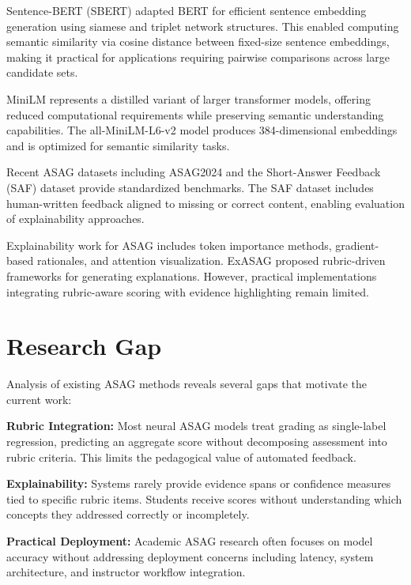 \documentclass[conference]{IEEEtran}
\begin{document}
Sentence-BERT (SBERT) \cite{sbert} adapted BERT for efficient sentence embedding generation using siamese and triplet network structures. This enabled computing semantic similarity via cosine distance between fixed-size sentence embeddings, making it practical for applications requiring pairwise comparisons across large candidate sets.

MiniLM represents a distilled variant of larger transformer models, offering reduced computational requirements while preserving semantic understanding capabilities. The all-MiniLM-L6-v2 model produces 384-dimensional embeddings and is optimized for semantic similarity tasks.

Recent ASAG datasets including ASAG2024 \cite{asag2024} and the Short-Answer Feedback (SAF) dataset \cite{saf2022} provide standardized benchmarks. The SAF dataset includes human-written feedback aligned to missing or correct content, enabling evaluation of explainability approaches.

Explainability work for ASAG includes token importance methods, gradient-based rationales, and attention visualization. ExASAG \cite{exasag} proposed rubric-driven frameworks for generating explanations. However, practical implementations integrating rubric-aware scoring with evidence highlighting remain limited.

\section{Research Gap}
Analysis of existing ASAG methods reveals several gaps that motivate the current work:

\textbf{Rubric Integration:} Most neural ASAG models treat grading as single-label regression, predicting an aggregate score without decomposing assessment into rubric criteria. This limits the pedagogical value of automated feedback.

\textbf{Explainability:} Systems rarely provide evidence spans or confidence measures tied to specific rubric items. Students receive scores without understanding which concepts they addressed correctly or incompletely.

\textbf{Practical Deployment:} Academic ASAG research often focuses on model accuracy without addressing deployment concerns including latency, system architecture, and instructor workflow integration.
\end{document}
